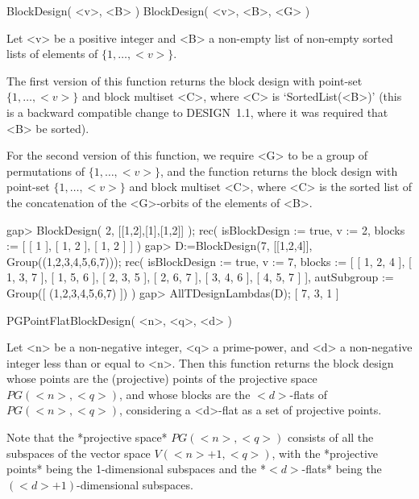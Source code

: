 %
%
%
%
\def\DESIGN{\sf DESIGN}
\def\GRAPE{\sf GRAPE}
\def\nauty{\it nauty}
\def\Aut{{\rm Aut}\,}
\def\lcm{{\rm lcm}\,}
\def\x{\times}


\>BlockDesign( <v>, <B> )
\>BlockDesign( <v>, <B>, <G> )

Let <v> be a positive integer and <B> a non-empty list of non-empty
sorted lists of elements of $\{1,\ldots,<v>\}$.

The first version of this function returns the block design with point-set
$\{1,\ldots,<v>\}$ and block multiset <C>, where <C> is `SortedList(<B>)'
(this is a backward compatible change to {\DESIGN}~1.1, where it was
required that <B> be sorted).

For the second version of this function, we require <G> to be a group
of permutations of $\{1,\ldots,<v>\}$, and the function returns the
block design with point-set $\{1,\ldots,<v>\}$ and block multiset <C>,
where <C> is the sorted list of the concatenation of the <G>-orbits of
the elements of <B>.

\beginexample
gap> BlockDesign( 2, [[1,2],[1],[1,2]] );
rec( isBlockDesign := true, v := 2, blocks := [ [ 1 ], [ 1, 2 ], [ 1, 2 ] ] )
gap> D:=BlockDesign(7, [[1,2,4]], Group((1,2,3,4,5,6,7)));
rec( isBlockDesign := true, v := 7, 
  blocks := [ [ 1, 2, 4 ], [ 1, 3, 7 ], [ 1, 5, 6 ], [ 2, 3, 5 ], 
      [ 2, 6, 7 ], [ 3, 4, 6 ], [ 4, 5, 7 ] ], 
  autSubgroup := Group([ (1,2,3,4,5,6,7) ]) )
gap> AllTDesignLambdas(D);
[ 7, 3, 1 ]
\endexample



\>PGPointFlatBlockDesign( <n>, <q>, <d> )

Let <n> be a non-negative integer, <q> a prime-power, and <d> a
non-negative integer less than or equal to <n>. Then this function
returns the block design whose points are the (projective) points of
the projective space $PG(<n>,<q>)$, and whose blocks are the $<d>$-flats
of $PG(<n>,<q>)$, considering a <d>-flat as a set of projective points.

Note that the *projective space* $PG(<n>,<q>)$ consists of all the
subspaces of the vector space $V(<n>+1,<q>)$, with the *projective
points* being the 1-dimensional subspaces and the *$<d>$-flats* being
the $(<d>+1)$-dimensional subspaces.


